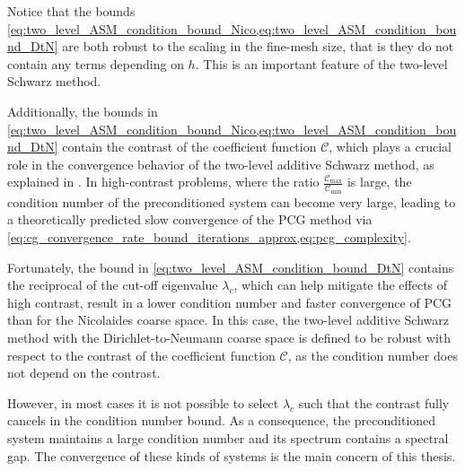 Notice that the bounds \cref{eq:two_level_ASM_condition_bound_Nico,eq:two_level_ASM_condition_bound_DtN} are both robust to the scaling in the fine-mesh size, that is they do not contain any terms depending on $h$. This is an important feature of the two-level Schwarz method.

Additionally, the bounds in \cref{eq:two_level_ASM_condition_bound_Nico,eq:two_level_ASM_condition_bound_DtN} contain the contrast of the coefficient function $\mathcal{C}$, which plays a crucial role in the convergence behavior of the two-level additive Schwarz method, as explained in \cite{msfem_coarse_space_Graham_2007}. In high-contrast problems, where the ratio $\frac{\mathcal{C}_{\text{max}}}{\mathcal{C}_{\text{min}}}$ is large, the condition number of the preconditioned system can become very large, leading to a theoretically predicted slow convergence of the PCG method via \cref{eq:cg_convergence_rate_bound_iterations_approx,eq:pcg_complexity}.

Fortunately, the bound in \cref{eq:two_level_ASM_condition_bound_DtN} contains the reciprocal of the cut-off eigenvalue $\lambda_c$, which can help mitigate the effects of high contrast, result in a lower condition number and faster convergence of PCG than for the Nicolaides coarse space. In this case, the two-level additive Schwarz method with the Dirichlet-to-Neumann coarse space is defined to be robust with respect to the contrast of the coefficient function $\mathcal{C}$, as the condition number does not depend on the contrast.

However, in most cases it is not possible to select $\lambda_c$ such that the contrast fully cancels in the condition number bound. As a consequence, the preconditioned system maintains a large condition number and its spectrum contains a spectral gap. The convergence of these kinds of systems is the main concern of this thesis.
